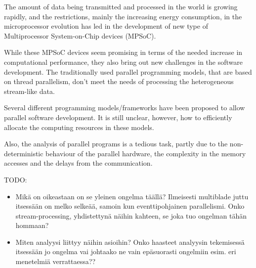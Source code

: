 The amount of data being transmitted and processed in the world is growing rapidly, and the restrictions, mainly the increasing energy consumption, in the microprocessor evolution has led in the development of new type of Multiprocessor System-on-Chip devices (MPSoC).

While these MPSoC devices seem promising in terms of the needed increase in computational performance, they also bring out new challenges in the software development. The traditionally used parallel programming models, that are based on thread parallelism, don't meet the needs of processing the heterogeneous stream-like data.

Several different programming models/frameworks have been proposed to allow parallel software development. It is still unclear, however, how to efficiently allocate the computing resources in these models.

Also, the analysis of parallel programs is a tedious task, partly due to the non-deterministic behaviour of the parallel hardware, the complexity in the memory accesses and the delays from the communication.

TODO:
\begin{itemize}
\item Mikä on oikeastaan on se yleinen ongelma täällä? Ilmeisesti multiblade juttu itsessään on melko selkeää, samoin kun eventtipohjainen parallelismi. Onko stream-processing, yhdistettynä näihin kahteen, se joka tuo ongelman tähän hommaan?
\item Miten analyysi liittyy näihin asioihin? Onko haasteet analyysin tekemisessä itsessään jo ongelma vai johtaako ne vain epäsuorasti ongelmiin esim. eri menetelmiä verrattaessa??
\end{itemize}

